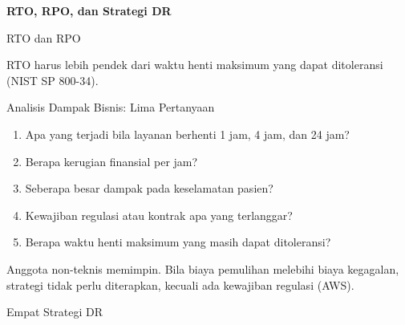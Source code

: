 \documentclass[aspectratio=169, table, 12pt]{beamer}
\begin{document}
\begin{frame}{\hfill}
  \centering
  \Huge{\textbf{RTO, RPO, dan Strategi DR}}
\end{frame}

\begin{frame}{{\Large RTO dan RPO}}
  \centering

  \vspace{4pt}
  {\small RTO harus lebih pendek dari waktu henti maksimum yang dapat ditoleransi (NIST SP
  800-34).}
\end{frame}

\begin{frame}{{\Large Analisis Dampak Bisnis: Lima Pertanyaan}}
  \vspace{6pt}
  \small
  \begin{enumerate}
    \item Apa yang terjadi bila layanan berhenti 1 jam, 4 jam, dan 24 jam?
    \item Berapa kerugian finansial per jam?
    \item Seberapa besar dampak pada keselamatan pasien?
    \item Kewajiban regulasi atau kontrak apa yang terlanggar?
    \item Berapa waktu henti maksimum yang masih dapat ditoleransi?
  \end{enumerate}
  \vspace{4pt}
  {\small Anggota non-teknis memimpin. Bila biaya pemulihan melebihi biaya kegagalan, strategi
  tidak perlu diterapkan, kecuali ada kewajiban regulasi (AWS).}
\end{frame}

\begin{frame}{{\Large Empat Strategi DR}}
  \centering
\end{frame}
\end{document}
